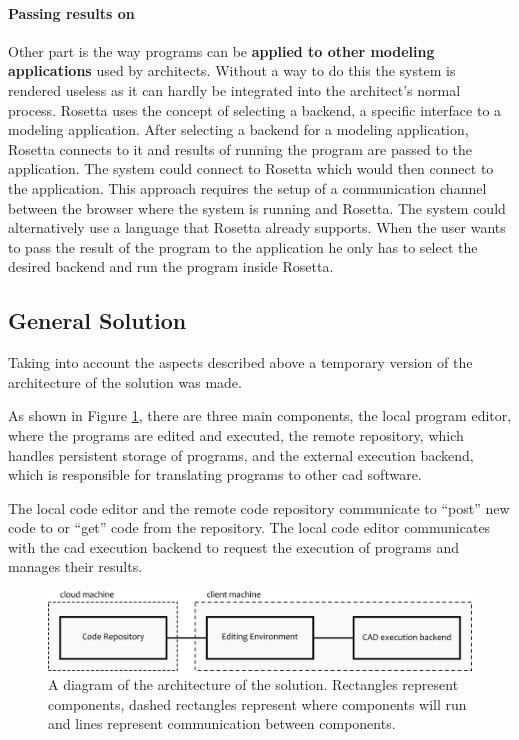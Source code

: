 \documentclass{./llncs2e/llncs}
\begin{document}
	\paragraph{Passing results on}
	Other part is the way programs can be \textbf{applied to other modeling applications} used by architects.
	Without a way to do this the system is rendered useless as it can hardly be integrated into the architect's normal process. 
	Rosetta uses the concept of selecting a backend, a specific interface to a modeling application. 
	After selecting a backend for a modeling application, Rosetta connects to it and results of running the program are passed to the application. 
	The system could connect to Rosetta which would then connect to the application. 
	This approach requires the setup of a communication channel between the browser where the system is running and Rosetta. 
	The system could alternatively use a language that Rosetta already supports. 
	When the user wants to pass the result of the program to the application he only has to select the desired backend and run the program inside Rosetta.


\subsection{General Solution}
	Taking into account the aspects described above a temporary version of the architecture of the solution was made.
	
	As shown in Figure \ref{fig:gen:sol}, there are three main components, the local program editor, where the programs are edited and executed, the remote repository, which handles persistent storage of programs, and the external execution backend, which is responsible for translating programs to other \ac{cad} software.
	
	The local code editor and the remote code repository communicate to ``post'' new code to or ``get'' code from the repository.
	The local code editor communicates with the \ac{cad} execution backend to request the execution of programs and manages their results.
	
	\begin{figure}
		\centering
		\includegraphics[width=1.0\textwidth]{img/gen_sol}
		\caption{A diagram of the architecture of the solution. Rectangles represent components, dashed rectangles represent where components will run and lines represent communication between components.}
		\label{fig:gen:sol}
	\end{figure}	
	
\end{document}
